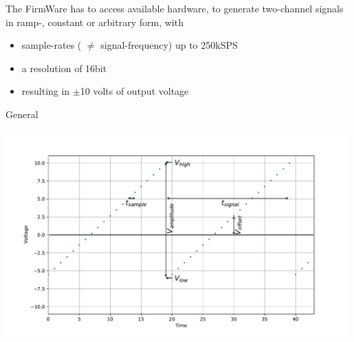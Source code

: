

	{ The FirmWare has to access available hardware, to generate two-channel signals in ramp-, constant or arbitrary form, with 
	\begin{itemize} \setlength\itemsep{1px}
	\item sample-rates ( $\ne$ signal-frequency) up to 250kSPS
	\item a resolution of 16bit
	\item resulting in $\pm$10 volts of output voltage
	\end{itemize}
	
	}
	{}{}{}{General}
	\begin{center}
	\includegraphics[width=0.99\textwidth, trim = {0 1.6cm 0 1.5cm}, clip]{src/_rampProperties.pdf}
	\end{center}
